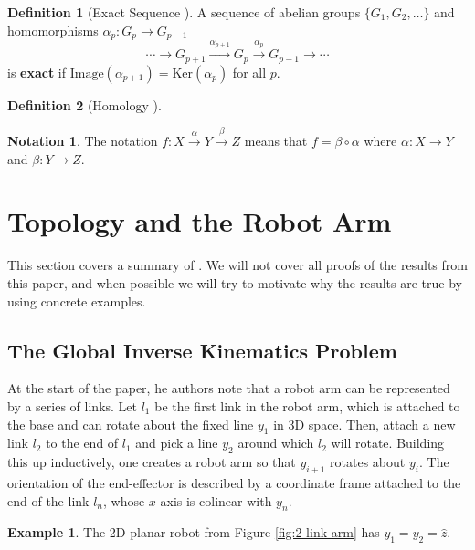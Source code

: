 \documentclass[12pt]{article}
\theoremstyle{definition}
\newtheorem{defn}{Definition}
\newtheorem{example}{Example}
\newtheorem*{notation}{Notation}
\begin{document}
\begin{defn}[Exact Sequence \cite{intro-top-manifolds}]
    A sequence of abelian groups \(\{G_1, G_2, \ldots\}\) and
    homomorphisms \(\alpha_p : G_p \rightarrow G_{p-1}\)
    \[
        \cdots \rightarrow G_{p+1} \xrightarrow{\alpha_{p+1}} G_p
    \xrightarrow{\alpha_p} G_{p-1} \rightarrow \cdots
    \]
    is \textbf{exact} if \(\text{Image}(\alpha_{p+1}) = \text{Ker}(\alpha_p)\)
    for all \(p\).
\end{defn}

\begin{defn}[Homology \cite{intro-top-manifolds}]

\end{defn}

\begin{notation}
    The notation
    \(f : X \xrightarrow{\alpha} Y \xrightarrow{\beta} Z\)
    means that \(f = \beta \circ \alpha\) where
    \(\alpha : X \rightarrow Y\) and \(\beta : Y \rightarrow Z\).
\end{notation}


\section{Topology and the Robot Arm}
This section covers a summary of \cite{topology-robot-arm}. We will not cover
all proofs of the results from this paper, and when possible we
will try to motivate why the results are true by using concrete examples.

\subsection{The Global Inverse Kinematics Problem}
At the start of the paper, he authors note that a robot arm can be represented
by a series of links. Let \(l_1\) be the first link in the robot arm, which is
attached to the base and can rotate about the fixed line \(y_1\) in 3D space.
Then, attach a new link \(l_2\) to the end of \(l_1\) and pick a line \(y_2\)
around which \(l_2\) will rotate. Building this up inductively, one creates a
robot arm so that \(y_{i+1}\) rotates about \(y_i\). The orientation of the
end-effector is described by a coordinate frame attached to the end of the link
\(l_n\), whose \(x\)-axis is colinear with \(y_n\).

\begin{example}
    The 2D planar robot from Figure \ref{fig:2-link-arm} has 
    \(y_1 = y_2 = \hat{z}\).
\end{example}
\end{document}
